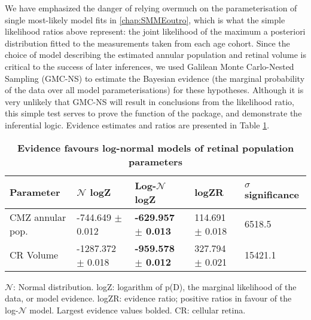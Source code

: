 We have emphasized the danger of relying overmuch on the parameterisation of single most-likely model fits in \autoref{chap:SMMEoutro}, which is what the simple likelihood ratios above represent: the joint likelihood of the maximum a posteriori distribution fitted to the measurements taken from each age cohort. Since the choice of model describing the estimated annular population and retinal volume is critical to the success of later inferences, we used Galilean Monte Carlo-Nested Sampling (GMC-NS) to estimate the Bayesian evidence (the marginal probability of the data over all model parameterisations) for these hypotheses. Although it is very unlikely that GMC-NS will result in conclusions from the likelihood ratio, this simple test serves to prove the function of the  package, and demonstrate the inferential logic. Evidence estimates and ratios are presented in Table \ref{PZRtable}.

\begin{table}[!ht]
    \centering
    \caption{
    {\bf Evidence favours log-normal models of retinal population parameters}}
    \begin{tabular}{|l|l|l|l|l|}
    \hline
    {\bf Parameter} & {\bf $\mathcal{N}$ logZ} & {\bf Log-$\mathcal{N}$ logZ} & {\bf logZR} & {\bf $\sigma$ significance}\\ \hline
    CMZ annular pop. & -744.649 $\pm$ 0.012 & {\bf -629.957 $\pm$ 0.013} & 114.691 $\pm$ 0.018 & 6518.5\\ \hline
    CR Volume & -1287.372 $\pm$ 0.018 & {\bf -959.578 $\pm$ 0.012} & 327.794 $\pm$ 0.021 & 15421.1\\ \hline
    \end{tabular}
    \begin{flushleft} $\mathcal{N}$: Normal distribution. logZ: logarithm of p(D), the marginal likelihood of the data, or model evidence. logZR: evidence ratio; positive ratios in favour of the log-$\mathcal{N}$ model. Largest evidence values bolded. CR: cellular retina.
    \end{flushleft}
    \label{PZRtable}
\end{table}

